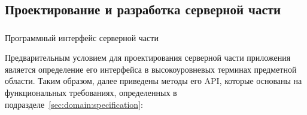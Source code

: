 \subsection{Проектирование и разработка серверной части}
\label{sec:design:server}

\subsubsection{} Программный интерфейс серверной части
\label{sec:design:server:interface}

Предварительным условием для проектирования серверной части приложения является определение его интерфейса в высокоуровневых терминах предметной области. Таким образом, далее приведены методы его API, которые основаны на функциональных требованиях, определенных в подразделе~\ref{sec:domain:specification}:

